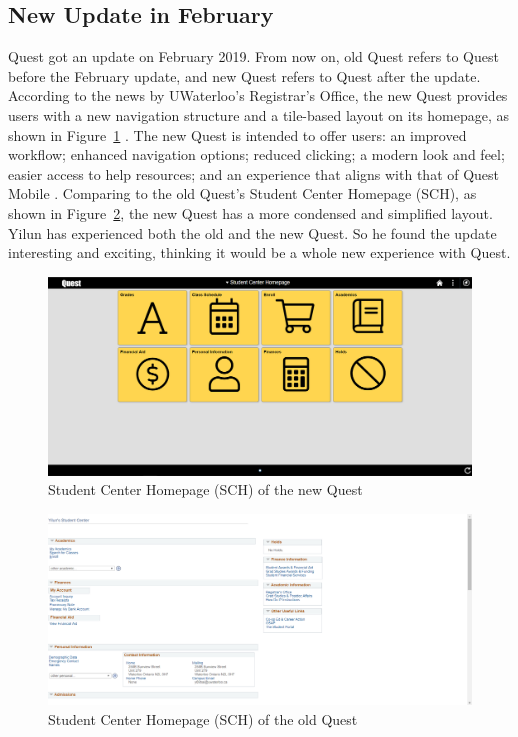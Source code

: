 \documentclass[conference]{IEEEtran}
\begin{document}
\subsection{New Update in February} \label{new update}
Quest got an update on February 2019. From now on, old Quest refers to Quest before the February update, and new Quest refers to Quest after the update. According to the news by UWaterloo's Registrar's Office, the new Quest provides users with a new navigation structure and a tile-based layout on its homepage, as shown in Figure~\ref{fig:figure2} \cite{b4}. The new Quest is intended to offer users: an improved workflow; enhanced navigation options; reduced clicking; a modern look and feel; easier access to help resources; and an experience that aligns with that of Quest Mobile \cite{b4}. Comparing to the old Quest's Student Center Homepage (SCH), as shown in Figure~\ref{fig:figure3}, the new Quest has a more condensed and simplified layout. Yilun has experienced both the old and the new Quest. So he found the update interesting and exciting, thinking it would be a whole new experience with Quest.

\begin{figure}[htdp]
  \centerline{\includegraphics[width=1\columnwidth]{Student_Center_Homepage.png}}
  \caption{Student Center Homepage (SCH) of the new Quest}
  \label{fig:figure2}
\end{figure}
\begin{figure}[htdp]
\centering
  \includegraphics[width=1\columnwidth]{Old_student_center_homepage.png}
  \caption{Student Center Homepage (SCH) of the old Quest}
  \label{fig:figure3}
\end{figure}
\end{document}
